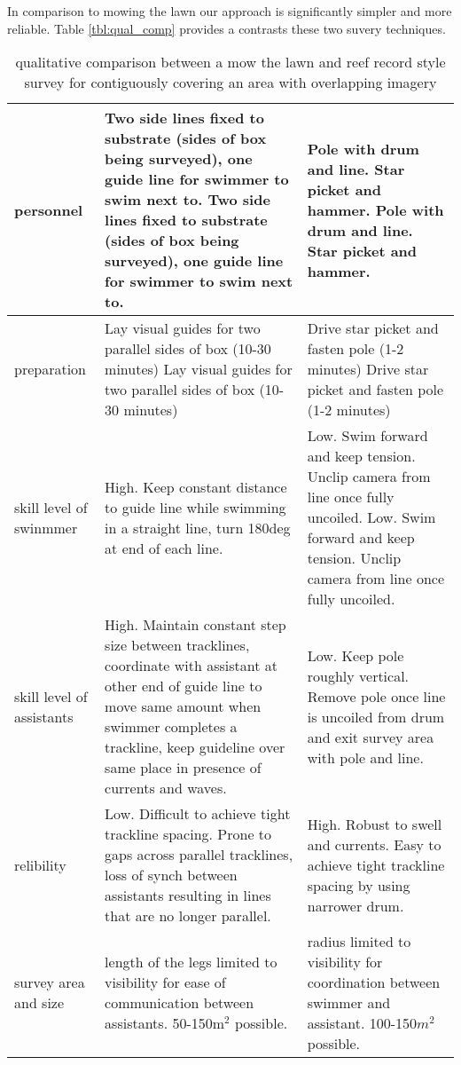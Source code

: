 In comparison to mowing the lawn \cite{Mahon_2011} our approach is significantly simpler and more reliable. Table \ref{tbl:qual_comp} provides a contrasts these two suvery techniques.
\begin{table} 
    \begin{tabular}{ | p{} | p{} | p{} |}
        personnel & Two side lines fixed to substrate (sides of box being surveyed), one guide line for swimmer to swim next to. Two side lines fixed to substrate (sides of box being surveyed), one guide line for swimmer to swim next to. & Pole with drum and line. Star picket and hammer. Pole with drum and line. Star picket and hammer. \\ 
        \hline
        preparation & Lay visual guides for two parallel sides of box (10-30 minutes) Lay visual guides for two parallel sides of box (10-30 minutes) & Drive star picket and fasten pole (1-2 minutes) Drive star picket and fasten pole (1-2 minutes) \\ 
        skill level of swinmmer & High. Keep constant distance to guide line while swimming in a straight line, turn 180deg at end of each line. & Low. Swim forward and keep tension. Unclip camera from line once fully uncoiled. Low. Swim forward and keep tension. Unclip camera from line once fully uncoiled. \\ 
        \hline
        skill level of assistants & High. Maintain constant step size between tracklines, coordinate with assistant at other end of guide line to move same amount when swimmer completes a trackline, keep guideline over same place in presence of currents and waves. & Low. Keep pole roughly vertical. Remove pole once line is uncoiled from drum and exit survey area with pole and line. \\
        \hline
        relibility & Low. Difficult to achieve tight trackline spacing. Prone to gaps across parallel tracklines, loss of synch between assistants resulting in lines that are no longer parallel. & High. Robust to swell and currents. Easy to achieve tight trackline spacing by using narrower drum. \\ 
        \hline
        survey area and size & length of the legs limited to visibility for ease of communication between assistants. 50-150m$^2$ possible.   & radius limited to visibility for coordination between swimmer and assistant. 100-150$m^2$ possible.    \\ 
    \end{tabular} 
    \caption{qualitative comparison between a mow the lawn and reef record style survey for contiguously covering an area with overlapping imagery} 
\end{table}


